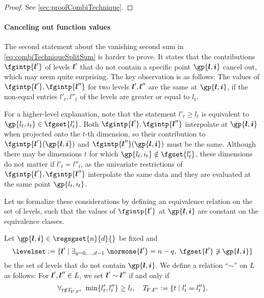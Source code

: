 \begin{proof}
  See \cref{sec:proofCombiTechnique}.
\end{proof}

\paragraph{Canceling out function values}

The second statement about the vanishing second sum in
\eqref{eq:combiTechniqueSplitSum} is harder to prove.
It states that the contributions $\fgintp{\*l'}$ of levels ${\boldsymbol{l}}'$
that do not contain a specific point $\gp{\*l,\*i}$ cancel out,
which may seem quite surprising.
The key observation is as follows:
The values of $\fgintp{\*l'}, \fgintp{\*l''}$ for two levels
${\boldsymbol{l}}', {\boldsymbol{l}}''$ are the same at $\gp{\*l,\*i}$,
if the non-equal entries $l'_t, l''_t$ of the levels are
greater or equal to $l_t$.

For a higher-level explanation,
note that the statement $l'_t \ge l_t$ is equivalent to
$\gp{l_t,i_t} \in \fgset{l'_t}$.
Both $\fgintp{\*l'}, \fgintp{\*l''}$ interpolate at
$\gp{\*l,\*i}$ when projected onto the $t$-th dimension,
so their contribution to $\fgintp{\*l'}(\gp{\*l,\*i})$ and
$\fgintp{\*l''}(\gp{\*l,\*i})$ must be the same.
Although there may be dimensions $t$ for which
$\gp{l_t,i_t} \notin \fgset{l'_t}$,
these dimensions do not matter if $l'_t = l''_t$,
as the univariate restrictions of $\fgintp{\*l'}, \fgintp{\*l''}$
interpolate the same data and they are evaluated at the same point
$\gp{l_t,i_t}$.

Let us formalize these considerations by defining an
equivalence relation on the set of levels, such that the values of
$\fgintp{\*l'}$ at $\gp{\*l,\*i}$ are constant
on the equivalence classes.

\begin{definition}
  \label{def:combiTechniqueEquivalenceRelation}
  Let $\gp{\*l,\*i} \in \regsgset{n}{d}{}$ be fixed and
  \begin{equation}
    \label{eq:combiTechniqueSpecialLevelSet}
    \levelset
    := \{\*l' \mid \ex{q=0,\dotsc,d-1}{
      \normone{\*l'} = n - q,\; \fgset{\*l'} \notni \gp{\*l,\*i}
    }\}
  \end{equation}
  be the set of levels that do not contain $\gp{\*l,\*i}$.
  We define a relation ``$\sim$'' on $L$ as follows:
  For ${\boldsymbol{l}}', {\boldsymbol{l}}'' \in L$, we set ${\boldsymbol{l}}' \sim {\boldsymbol{l}}''$ if and only if
  \begin{equation}
    \forall_{t \notin T_{{\boldsymbol{l}}',{\boldsymbol{l}}''}}\;\min\{l'_t, l''_t\} \ge l_t,\quad
    T_{{\boldsymbol{l}}',{\boldsymbol{l}}''}
    := \{t \mid l'_t = l''_t\}.
  \end{equation}
\end{definition}

